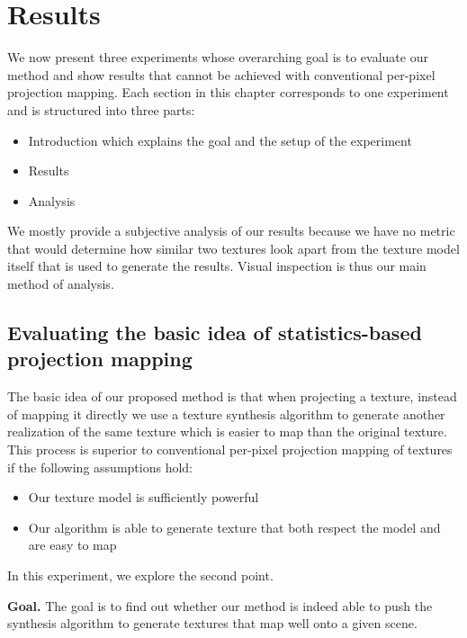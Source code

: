 \chapter{Results}
\label{chapter:results}

We now present three experiments whose overarching goal is to evaluate our method and show results that cannot be achieved with conventional per-pixel projection mapping. Each section in this chapter corresponds to one experiment and is structured into three parts: 

\begin{itemize}
    \item Introduction which explains the goal and the setup of the experiment
    \item Results
    \item Analysis
\end{itemize}

We mostly provide a subjective analysis of our results because we have no metric that would determine how similar two textures look apart from the texture model itself that is used to generate the results. Visual inspection is thus our main method of analysis.

\section{Evaluating the basic idea of statistics-based projection mapping}
\label{section:results-experiments-01}

The basic idea of our proposed method is that when projecting a texture, instead of mapping it directly we use a texture synthesis algorithm to generate another realization of the same texture which is easier to map than the original texture. This process is superior to conventional per-pixel projection mapping of textures if the following assumptions hold:

\begin{itemize}
    \item Our texture model is sufficiently powerful
    \item Our algorithm is able to generate texture that both respect the model and are easy to map
\end{itemize}

In this experiment, we explore the second point.

\textbf{Goal.} The goal is to find out whether our method is indeed able to push the synthesis algorithm to generate textures that map well onto a given scene.


